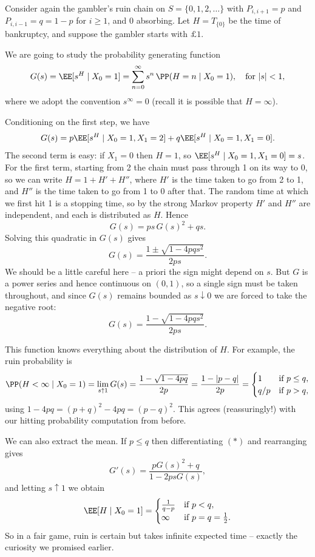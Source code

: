 \begin{example}
	Consider again the gambler's ruin chain on $S = \{0, 1, 2, \dots\}$ with $P_{i, i + 1} = p$ and $P_{i, i - 1} = q = 1 - p$ for $i \geq 1$, and $0$ absorbing. Let $H = T_{\{0\}}$ be the time of bankruptcy, and suppose the gambler starts with $\pounds 1$.

	We are going to study the probability generating function
	$$
	G(s) = \EE[s^H \mid X_0 = 1] = \sum_{n = 0}^{\infty} s^n \, \PP(H = n \mid X_0 = 1), \quad \text{for } |s| < 1,
	$$
	where we adopt the convention $s^{\infty} = 0$ (recall it is possible that $H = \infty$).

	Conditioning on the first step, we have
	$$
	G(s) = p\EE[s^H \mid X_0 = 1, X_1 = 2] + q\EE[s^H \mid X_0 = 1, X_1 = 0].
	$$
	The second term is easy: if $X_1 = 0$ then $H = 1$, so $\EE[s^H \mid X_0 = 1, X_1 = 0] = s$. For the first term, starting from 2 the chain must pass through 1 on its way to 0, so we can write $H = 1 + H' + H''$, where $H'$ is the time taken to go from 2 to 1, and $H''$ is the time taken to go from 1 to 0 after that. The random time at which we first hit 1 is a stopping time, so by the strong Markov property $H'$ and $H''$ are independent, and each is distributed as $H$. Hence
	\begin{equation}
	G(s) = ps\, G(s)^2 + qs. \tag{$*$}
	\end{equation}
	Solving this quadratic in $G(s)$ gives
	$$
	G(s) = \frac{1 \pm \sqrt{1 - 4pqs^2}}{2ps}.
	$$
	We should be a little careful here -- a priori the sign might depend on $s$. But $G$ is a power series and hence continuous on $(0, 1)$, so a single sign must be taken throughout, and since $G(s)$ remains bounded as $s \downarrow 0$ we are forced to take the negative root:
	$$
	G(s) = \frac{1 - \sqrt{1 - 4pqs^2}}{2ps}.
	$$

	This function knows everything about the distribution of $H$. For example, the ruin probability is
	$$
	\PP(H < \infty \mid X_0 = 1) = \lim_{s \uparrow 1} G(s) = \frac{1 - \sqrt{1 - 4pq}}{2p} = \frac{1 - |p - q|}{2p} = \begin{cases}
		1 &\mbox{if } p \leq q, \\
		q/p &\mbox{if } p > q,
	   \end{cases}
	$$
	using $1 - 4pq = (p + q)^2 - 4pq = (p - q)^2$. This agrees (reassuringly!) with our hitting probability computation from before.

	We can also extract the mean. If $p \leq q$ then differentiating $(*)$ and rearranging gives
	$$
	G'(s) = \frac{pG(s)^2 + q}{1 - 2psG(s)},
	$$
	and letting $s \uparrow 1$ we obtain
	$$
	\EE[H \mid X_0 = 1] = \begin{cases}
		\frac{1}{q - p} &\mbox{if } p < q, \\
		\infty &\mbox{if } p = q = \frac{1}{2}.
	   \end{cases}
	$$
	So in a fair game, ruin is certain but takes infinite expected time -- exactly the curiosity we promised earlier.
\end{example}

